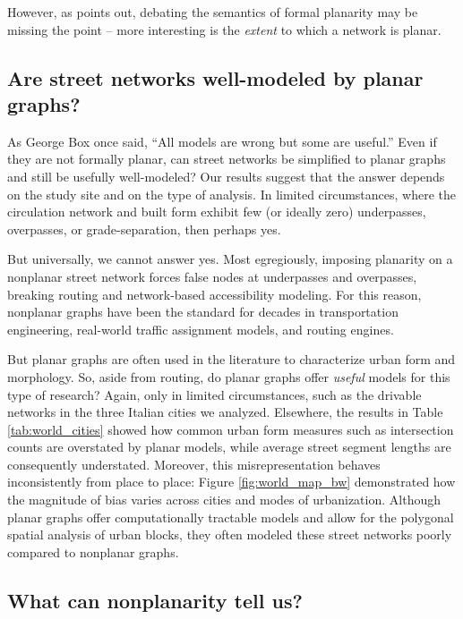 \documentclass[Afour,sageh,times]{sagej}
\begin{document}
However, as \citet{newman_networks:_2010} points out, debating the semantics of formal planarity may be missing the point -- more interesting is the \emph{extent} to which a network is planar.

\subsection{Are street networks well-modeled by planar graphs?}

As George Box once said, \enquote{All models are wrong but some are useful.} Even if they are not formally planar, can street networks be simplified to planar graphs and still be usefully well-modeled? Our results suggest that the answer depends on the study site and on the type of analysis. In limited circumstances, where the circulation network and built form exhibit few (or ideally zero) underpasses, overpasses, or grade-separation, then perhaps yes.

But universally, we cannot answer yes. Most egregiously, imposing planarity on a nonplanar street network forces false nodes at underpasses and overpasses, breaking routing and network-based accessibility modeling. For this reason, nonplanar graphs have been the standard for decades in transportation engineering, real-world traffic assignment models, and routing engines.

But planar graphs are often used in the literature to characterize urban form and morphology. So, aside from routing, do planar graphs offer \emph{useful} models for this type of research? Again, only in limited circumstances, such as the drivable networks in the three Italian cities we analyzed. Elsewhere, the results in Table \ref{tab:world_cities} showed how common urban form measures such as intersection counts are overstated by planar models, while average street segment lengths are consequently understated. Moreover, this misrepresentation behaves inconsistently from place to place: Figure \ref{fig:world_map_bw} demonstrated how the magnitude of bias varies across cities and modes of urbanization. Although planar graphs offer computationally tractable models and allow for the polygonal spatial analysis of urban blocks, they often modeled these street networks poorly compared to nonplanar graphs.


\subsection{What can nonplanarity tell us?}
\end{document}
